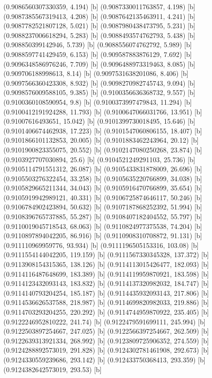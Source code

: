 {{{(0.9086560307330359, 4.194) [b] 
(0.9087330011763857, 4.198) [b] 
(0.9087385567319413, 4.208) [b] 
(0.9087642135463911, 4.241) [b] 
(0.9087782521807128, 5.021) [b] 
(0.9087980438473795, 5.231) [b] 
(0.9088237006618294, 5.283) [b] 
(0.9088493574762793, 5.438) [b] 
(0.908850399142946, 5.739) [b] 
(0.9088556074762792, 5.989) [b] 
(0.9088597741429459, 6.153) [b] 
(0.909587883876129, 7.692) [b] 
(0.9096348586976246, 7.709) [b] 
(0.9096488973319463, 8.085) [b] 
(0.909706188998613, 8.14) [b] 
(0.9097531638201086, 8.406) [b] 
(0.9097566360423308, 8.932) [b] 
(0.9098270982745743, 9.094) [b] 
(0.9098576009588105, 9.385) [b] 
(0.9100356636368732, 9.557) [b] 
(0.9100360108590954, 9.8) [b] 
(0.9100373997479843, 11.294) [b] 
(0.9100412191924288, 11.793) [b] 
(0.9100647066031766, 13.951) [b] 
(0.91007616493651, 15.042) [b] 
(0.9101399730018495, 15.646) [b] 
(0.9101406674462938, 17.223) [b] 
(0.9101547060806155, 18.407) [b] 
(0.9101866101132853, 20.005) [b] 
(0.9101883462243964, 20.12) [b] 
(0.9101900823355075, 20.552) [b] 
(0.9102147080250268, 23.874) [b] 
(0.9103927707030894, 25.6) [b] 
(0.9104521249291103, 25.736) [b] 
(0.9105114791551312, 26.087) [b] 
(0.9105433831878009, 26.696) [b] 
(0.9105503276322454, 33.258) [b] 
(0.9105635220766899, 34.038) [b] 
(0.9105829665211344, 34.043) [b] 
(0.9105916470766899, 35.654) [b] 
(0.9105919942989121, 40.331) [b] 
(0.9106725874646117, 50.246) [b] 
(0.9106784902423894, 50.632) [b] 
(0.9107187868252392, 51.994) [b] 
(0.9108396765737885, 55.287) [b] 
(0.9108407182404552, 55.797) [b] 
(0.9110019045718543, 68.063) [b] 
(0.9110824977375538, 74.204) [b] 
(0.9110897894042205, 86.916) [b] 
(0.9110908310708872, 91.131) [b] 
(0.911110969959776, 93.934) [b] 
(0.9111196505153316, 103.08) [b] 
(0.9111554144042205, 119.159) [b] 
(0.9111567330345328, 137.372) [b] 
(0.9113908154315365, 138.126) [b] 
(0.9114113015426477, 182.093) [b] 
(0.9114116487648699, 183.389) [b] 
(0.9114119959870921, 183.598) [b] 
(0.9114123432093143, 183.832) [b] 
(0.9114137320982032, 184.747) [b] 
(0.9114140793204254, 185.187) [b] 
(0.9114435932093143, 217.806) [b] 
(0.9114536626537588, 218.987) [b] 
(0.9114699820982033, 219.886) [b] 
(0.9114703293204255, 220.292) [b] 
(0.9114744959870922, 235.405) [b] 
(0.9122246952810222, 241.74) [b] 
(0.9122479591699111, 245.994) [b] 
(0.9122503897254667, 247.025) [b] 
(0.9122566397254667, 262.509) [b] 
(0.9122639313921334, 268.992) [b] 
(0.9123809725906352, 274.559) [b] 
(0.9124288892573019, 291.828) [b] 
(0.9124302781461908, 292.673) [b] 
(0.9124330559239686, 293.142) [b] 
(0.912433750368413, 293.359) [b] 
(0.9124382642573019, 293.53) [b] 
}}}
